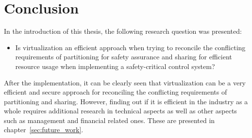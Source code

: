 

\section{Conclusion}
In the introduction of this thesis, the following research question was presented:

\begin{itemize}
\item Is virtualization an efficient approach when trying to reconcile the conflicting requirements of partitioning for safety assurance and sharing for efficient resource usage when implementing a safety-critical control system?
\end{itemize}

After the implementation, it can be clearly seen that virtualization can be a very efficient and secure approach for reconciling the conflicting requirements of partitioning and sharing. However, finding out if it is efficient in the industry as a whole requires additional research in technical aspects as well as other aspects such as management and financial related ones. These are presented in chapter~\ref{sec:future_work}.
